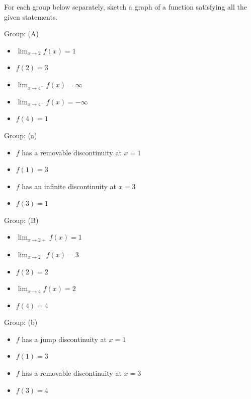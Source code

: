 \documentclass[10pt]{article}
\begin{document}
\newpage

For each group below separately, sketch a graph of a function satisfying all the given statements.\\

\begin{minipage}[t][2in]{0.45\textwidth}
Group: (A)
    \begin{itemize}
    \item $\displaystyle\lim_{x\to2}f(x) = 1$
    \item $f(2)=3$
    \item $\displaystyle\lim_{x\to4^+} f(x)=\infty$
    \item $\displaystyle\lim_{x\to4^-} f(x)=-\infty$
    \item $f(4)=1$\\
    \end{itemize}
\end{minipage}
%
\hfill
%
\begin{minipage}[t][2in]{0.45\textwidth}
Group: (a)
    \begin{itemize}
    \item $f$ has a removable discontinuity at $x=1$
    \item $f(1)=3$
    \item $f$ has an infinite discontinuity at $x=3$
    \item $f(3)=1$\\[0.2in]
    \end{itemize}
\end{minipage}
%
%
\vfill
%
%
\begin{minipage}[t][2in]{0.45\textwidth}
Group: (B)
    \begin{itemize}
    \item $\displaystyle\lim_{x\to2+}f(x)=1$
    \item $\displaystyle\lim_{x\to2^-}f(x)=3$
    \item $f(2)=2$
    \item $\displaystyle\lim_{x\to4}f(x)=2$
    \item $f(4)=4$\\
    \end{itemize}
\end{minipage}
%
\hfill
%
\begin{minipage}[t][2in]{0.45\textwidth}
Group: (b)
    \begin{itemize}
    \item $f$ has a jump discontinuity at $x=1$
    \item $f(1)=3$
    \item $f$ has a removable discontinuity at $x=3$
    \item $f(3)=4$\\[0.2in]
    \end{itemize}
\end{minipage}
\end{document}
